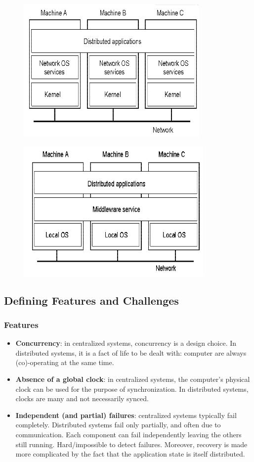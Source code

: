 \documentclass[10pt,a4paper]{article}
\begin{document}
\begin{figure}[h!]
\centering
\begin{minipage}{.5\textwidth}
  \centering
  \includegraphics[width=.6\linewidth]{images/network.png}
  \label{fig:network}
\end{minipage}%
\begin{minipage}{.5\textwidth}
  \centering
  \includegraphics[width=.5\linewidth]{images/middleware.png}
  \label{fig:middleware}
\end{minipage}
\end{figure} 
\subsection{Defining Features and Challenges}
\subsubsection{Features}
\begin{itemize}
	\item \textbf{Concurrency}: in centralized systems, concurrency is a design choice. In distributed systems, it is a fact of life to be dealt with: computer are always (co)-operating at the same time.
	\item \textbf{Absence of a global clock}: in centralized systems, the computer's physical clock can be used for the purpose of synchronization. In distributed systems, clocks are many and not necessarily synced.
	\item \textbf{Independent (and partial) failures}: centralized systems typically fail completely. Distributed systems fail only partially, and often due to communication. Each component can fail independently leaving the others still running. Hard/impossible to detect failures. Moreover, recovery is made more complicated by the fact that the application state is itself distributed.
\end{itemize}
\end{document}
